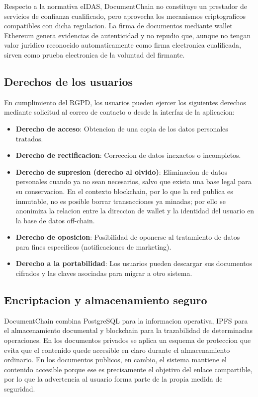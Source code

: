 \documentclass[11pt, a4paper]{article}
\begin{document}
Respecto a la normativa eIDAS, DocumentChain no constituye un prestador de servicios de confianza cualificado, pero aprovecha los mecanismos criptograficos compatibles con dicha regulacion. La firma de documentos mediante wallet Ethereum genera evidencias de autenticidad y no repudio que, aunque no tengan valor juridico reconocido automaticamente como firma electronica cualificada, sirven como prueba electronica de la voluntad del firmante.

\subsection{Derechos de los usuarios}

En cumplimiento del RGPD, los usuarios pueden ejercer los siguientes derechos mediante solicitud al correo de contacto o desde la interfaz de la aplicacion:

\begin{itemize}
    \item \textbf{Derecho de acceso}: Obtencion de una copia de los datos personales tratados.
    \item \textbf{Derecho de rectificacion}: Correccion de datos inexactos o incompletos.
    \item \textbf{Derecho de supresion (derecho al olvido)}: Eliminacion de datos personales cuando ya no sean necesarios, salvo que exista una base legal para su conservacion. En el contexto blockchain, por lo que la red publica es inmutable, no es posible borrar transacciones ya minadas; por ello se anonimiza la relacion entre la direccion de wallet y la identidad del usuario en la base de datos off-chain.
    \item \textbf{Derecho de oposicion}: Posibilidad de oponerse al tratamiento de datos para fines especificos (notificaciones de marketing).
    \item \textbf{Derecho a la portabilidad}: Los usuarios pueden descargar sus documentos cifrados y las claves asociadas para migrar a otro sistema.
\end{itemize}

\subsection{Encriptacion y almacenamiento seguro}

DocumentChain combina PostgreSQL para la informacion operativa, IPFS para el almacenamiento documental y blockchain para la trazabilidad de determinadas operaciones. En los documentos privados se aplica un esquema de proteccion que evita que el contenido quede accesible en claro durante el almacenamiento ordinario. En los documentos publicos, en cambio, el sistema mantiene el contenido accesible porque ese es precisamente el objetivo del enlace compartible, por lo que la advertencia al usuario forma parte de la propia medida de seguridad.
\end{document}
